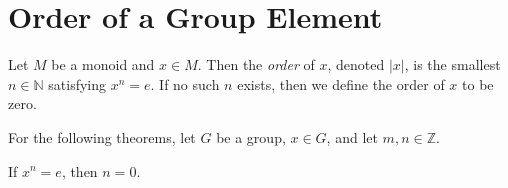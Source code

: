 \section{Order of a Group Element}

\begin{definition}
    \label{definition : order}
    \leanok
    Let $M$ be a monoid and $x \in M$. Then the \textit{order} of $x$, denoted $|x|$, is the smallest $n \in \mathbb{N}$ satisfying $x^n = e$. If no such $n$ exists, then we define the order of $x$ to be zero.
\end{definition}

For the following theorems, let $G$ be a group, $x \in G$, and let $m,n \in \mathbb{Z}$.

\begin{theorem}
    \label{theorem : gpow_order}
    \leanok
    If $x^n = e$, then $n = 0$.
\end{theorem}
